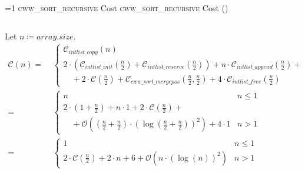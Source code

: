 \setcounter{cwwsortrecursivecostcounter}{1}
\newcommand{\cwwsortrecursivecostframe}{%
    \ifnum\value{cwwsortrecursivecostcounter}=1
        \textsc{cww\_sort\_recursive} Cost%
    \else
        \textsc{cww\_sort\_recursive} Cost (\thecwwsortrecursivecostcounter)%
    \fi
}
            \begin{frame}{\cwwsortrecursivecostframe}
                \begin{columns}[c]
                    \begin{column}{0.7\textwidth}
                        \footnotesize
                        Let $n \coloneqq array.size$.
                        \begin{align*}
                            \mathcal{C}{\left(n\right)} = & \; \begin{cases}
                                \mathcal{C}_{intlist\_copy}{\left(n\right)} & n \leq 1 \\
                                2 \cdot \left(\mathcal{C}_{intlist\_init}{\left(\frac{n}{2}\right)} + \mathcal{C}_{intlist\_reserve}{\left(\frac{n}{2}\right)}\right) + n \cdot \mathcal{C}_{intlist\_append}{\left(\frac{n}{2}\right)} + \\
                                \quad + 2 \cdot \mathcal{C}{\left(\frac{n}{2}\right)} + \mathcal{C}_{cww\_sort\_mergepos}{\left(\frac{n}{2}, \frac{n}{2}\right)} + 4 \cdot \mathcal{C}_{intlist\_free}{\left(\frac{n}{2}\right)} & n > 1
                            \end{cases} 
                            \\
                            = & \; \begin{cases}
                                n & n \leq 1 \\
                                2 \cdot \left(1 + \frac{n}{2}\right) + n \cdot 1 + 2 \cdot \mathcal{C}{\left(\frac{n}{2}\right)} + \\
                                \quad + \mathcal{O}{\left(\left(\frac{n}{2} + \frac{n}{2}\right) \cdot \left(\log{\left(\frac{n}{2} + \frac{n}{2}\right)}\right)^2\right)} + 4 \cdot 1 & n > 1
                            \end{cases} \\
                            = & \; \begin{cases}
                                1 & n \leq 1 \\
                                2 \cdot \mathcal{C}{\left(\frac{n}{2}\right)} + 2 \cdot n + 6 + \mathcal{O}{\left(n \cdot \left(\log{\left(n\right)}\right)^2\right)} & n > 1
                            \end{cases}
                        \end{align*}
                    \end{column}


\end{columns}
\end{frame}
